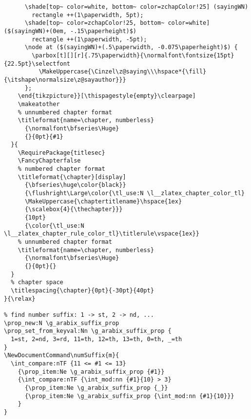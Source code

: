 \begin{verbatim}
      \shade[top~ color=white, bottom~ color=zchapColor!25] (sayingWN) 
        rectangle ++(1\paperwidth, 5pt);
      \shade[top~ color=zchapColor!25, bottom~ color=white] ($(sayingWN)+(0em, -.15\paperheight)$) 
        rectangle ++(1\paperwidth, -5pt);
      \node at ($(sayingWN)+(.5\paperwidth, -0.075\paperheight)$) {
        \parbox[t][][r]{.75\paperwidth}{\normalfont\fontsize{15pt}{22.5pt}\selectfont
          \MakeUppercase{\Cinzel\z@saying\\\hspace*{\fill}{\itshape\normalsize\z@sayauthor}}}
      };
    \end{tikzpicture}}[\thispagestyle{empty}\clearpage]
    \makeatother
    % unnumbered chapter format
    \titleformat{name=\chapter, numberless}
      {\normalfont\bfseries\Huge}
      {}{0pt}{#1}
  }{
    \RequirePackage{titlesec}
    \FancyChapterfalse
    % numbered chapter format
    \titleformat{\chapter}[display]
      {\bfseries\huge\color{black}}
      {\flushright\Large\color{\tl_use:N \l__zlatex_chapter_color_tl}
      \MakeUppercase{\chaptertitlename}\hspace{1ex}
      {\scalebox{4}{\thechapter}}}
      {10pt}
      {\color{\tl_use:N \l__zlatex_chapter_rule_color_tl}\titlerule\vspace{1ex}}
    % unnumbered chapter format
    \titleformat{name=\chapter, numberless}
      {\normalfont\bfseries\Huge}
      {}{0pt}{}
  }
  % chapter space
  \titlespacing{\chapter}{0pt}{-30pt}{40pt}
}{\relax}

% find number suffix: 1 -> st, 2 -> nd, ...
\prop_new:N \g_arabix_suffix_prop
\prop_set_from_keyval:Nn \g_arabix_suffix_prop {
  1=st, 2=nd, 3=rd, 11=th, 12=th, 13=th, 0=th, _=th
} 
\NewDocumentCommand\numSuffix{m}{
  \int_compare:nTF {11 <= #1 <= 13}
    {\prop_item:Ne \g_arabix_suffix_prop {#1}}
    {\int_compare:nTF {\int_mod:nn {#1}{10} > 3}
      {\prop_item:Ne \g_arabix_suffix_prop {_}}
      {\prop_item:Ne \g_arabix_suffix_prop {\int_mod:nn {#1}{10}}}
    }
}


\end{verbatim}
